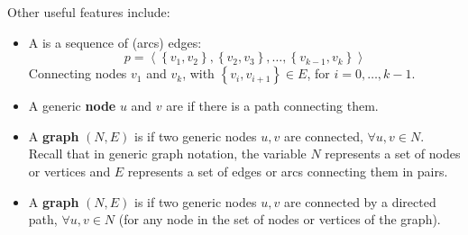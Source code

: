 \highspace
Other useful features include:
\begin{itemize}
    \item A  is a sequence of (arcs) edges:
    \begin{equation*}
        p = \left\langle \left\{v_{1}, v_{2}\right\}, \left\{v_{2}, v_{3}\right\}, \dots, \left\{v_{k-1}, v_{k}\right\} \right\rangle
    \end{equation*}
    Connecting nodes $v_{1}$ and $v_{k}$, with $\left\{v_{i}, v_{i+1}\right\} \in E$, for $i = 0, \dots, k-1$.

    \item A generic \textbf{node} $u$ and $v$ are  if there is a path connecting them.
    
    \item A \textbf{graph} $\left(N,E\right)$ is  if two generic nodes $u,v$ are connected, $\forall u,v \in N$. Recall that in generic graph notation, the variable $N$ represents a set of nodes or vertices and $E$ represents a set of edges or arcs connecting them in pairs.
    
    \item A \textbf{graph} $\left(N,E\right)$ is  if two generic nodes $u,v$ are connected by a directed path, $\forall u,v \in N$ (for any node in the set of nodes or vertices of the graph).
\end{itemize}


